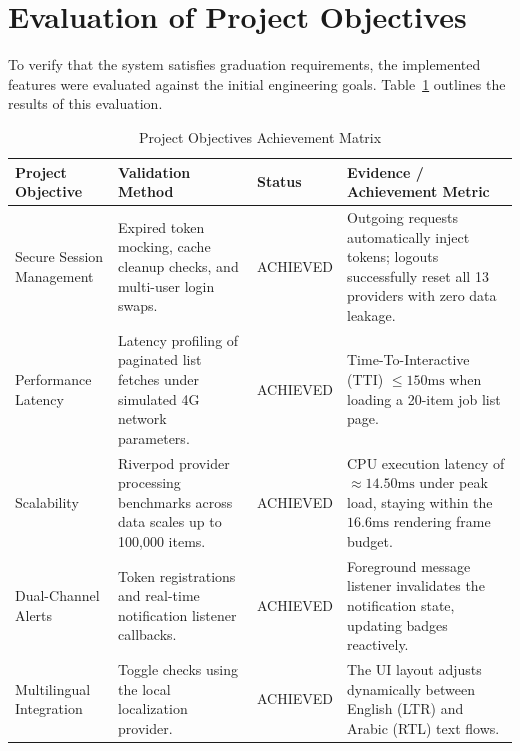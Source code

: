 \section{Evaluation of Project Objectives}
To verify that the system satisfies graduation requirements, the implemented features were evaluated against the initial engineering goals. Table~\ref{tab:objectives_validation} outlines the results of this evaluation.

\begin{table}[htbp]
\centering
\caption{Project Objectives Achievement Matrix}
\label{tab:objectives_validation}
\begin{tabular}{|p{3cm}|p{3.5cm}|l|p{4cm}|}
\hline
\textbf{Project Objective} & \textbf{Validation Method} & \textbf{Status} & \textbf{Evidence / Achievement Metric} \\ \hline
Secure Session Management & Expired token mocking, cache cleanup checks, and multi-user login swaps. & ACHIEVED & Outgoing requests automatically inject tokens; logouts successfully reset all 13 providers with zero data leakage. \\ \hline
Performance Latency & Latency profiling of paginated list fetches under simulated 4G network parameters. & ACHIEVED & Time-To-Interactive (TTI) $\le 150\text{ms}$ when loading a 20-item job list page. \\ \hline
Scalability & Riverpod provider processing benchmarks across data scales up to 100,000 items. & ACHIEVED & CPU execution latency of $\approx 14.50\text{ms}$ under peak load, staying within the $16.6\text{ms}$ rendering frame budget. \\ \hline
Dual-Channel Alerts & Token registrations and real-time notification listener callbacks. & ACHIEVED & Foreground message listener invalidates the notification state, updating badges reactively. \\ \hline
Multilingual Integration & Toggle checks using the local localization provider. & ACHIEVED & The UI layout adjusts dynamically between English (LTR) and Arabic (RTL) text flows. \\ \hline
\end{tabular}
\end{table}

